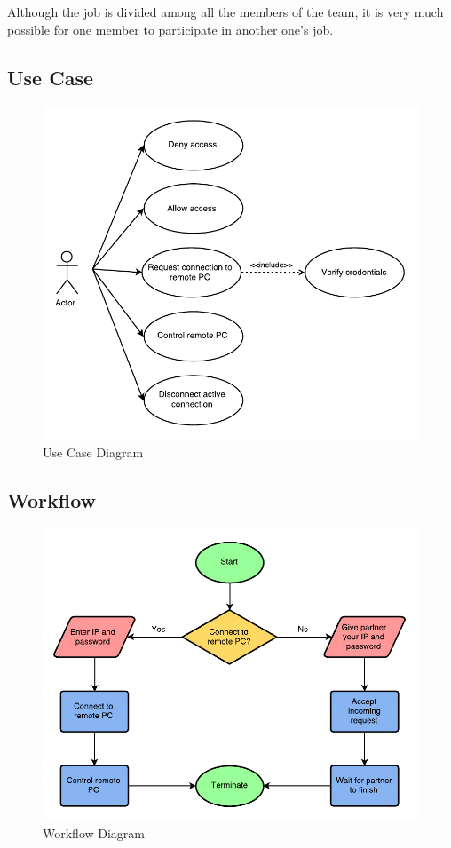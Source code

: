 \documentclass[12pt, a4paper]{article}
\begin{document}
Although the job is divided among all the members of the team, it is very much possible for one member to participate in another one's job.

\subsection{Use Case}

\begin{figure}[h!]
\centering
\includegraphics[scale=1]{remote-pc-controller-usecase}
\caption{Use Case Diagram}
\end{figure}

\newpage

\subsection{Workflow}

\begin{figure}[h!]
\centering
\includegraphics[scale=0.9]{remote-pc-controller-workflow}
\caption{Workflow Diagram}
\end{figure}
\end{document}
